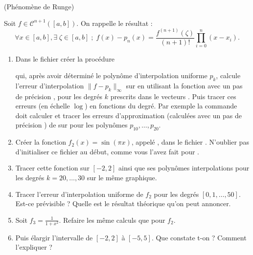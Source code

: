 \documentclass[a4paper,12pt,reqno]{amsart}
\begin{document}
\begin{exo} (Phénomène de Runge)

  Soit $f \in {\mathcal{C}}^{n+1}([a,b])$. On rappelle le résultat :
  $$
    \forall x \in [a,b], \exists \; \zeta \in [a,b] \; ; \;  f(x)-p_n(x)=\frac{f^{(n+1)}(\zeta)}{(n+1)!} \prod_{i=0}^n (x-x_i).
  $$

  \begin{enumerate}
    \item Dans le fichier  créer la procédure
    \begin{center}
    \end{center}
    qui, après avoir déterminé le polynôme d'interpolation uniforme $p_k$, calcule l'erreur d'interpolation $\| f - p_{k} \|_{\infty}$ sur \mtlb{[-a,a]} en utilisant la fonction  avec un pas de précision , pour les degrés $k$ prescrits dans le vecteurs . Puis tracer ces erreurs (en échelle $\log$) en fonctions du degré.\newline
    Par exemple la commande  doit calculer et tracer les erreurs d'approximation (calculées avec un pas de précision ) de  sur \mtlb{[-3,3]} pour les polynômes $p_{10},\ldots,p_{20}$.

    \item Créer la fonction $f_{2}(x)=\sin(\pi x)$, appelé , dans le fichier . N'oublier pas d'initialiser ce fichier au début, comme vous l'avez fait pour .

    \item Tracer cette fonction sur $[-2,2]$ ainsi que ses polynômes interpolations pour les degrés $k=20,\ldots,30$ sur le même graphique.

    \item Tracer l'erreur d'interpolation uniforme de $f_{2}$ pour les degrés $[0,1,\ldots,50]$. Est-ce prévisible ? Quelle est le résultat théorique qu'on peut annoncer.

    \item Soit $f_{3}=\frac{1}{1+x^{2}}$. Refaire les même calculs que pour $f_{2}$.

    \item Puis élargir l'intervalle de $[-2,2]$ à $[-5,5]$. Que constate t-on ? Comment l'expliquer ?
  \end{enumerate}
\end{exo}
\end{document}
